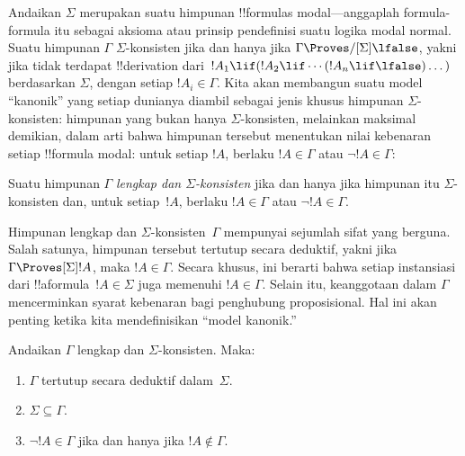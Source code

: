 \documentclass[../../../include/open-logic-section]{subfiles}
\begin{document}


Andaikan $\Sigma$ merupakan suatu himpunan !!{formula}s modal---anggaplah
formula-formula itu sebagai aksioma atau prinsip pendefinisi suatu logika
modal normal. Suatu himpunan $\Gamma$ $\Sigma$-konsisten jika dan hanya jika
$\Gamma \Proves/[\Sigma] \lfalse$, yakni jika tidak terdapat !!{derivation}
dari~$!A_1 \lif (!A_2 \lif \cdots (!A_n \lif \lfalse)\dots)$ berdasarkan
$\Sigma$, dengan setiap $!A_i \in \Gamma$. Kita akan membangun suatu model
``kanonik'' yang setiap dunianya diambil sebagai jenis khusus himpunan
$\Sigma$-konsisten: himpunan yang bukan hanya $\Sigma$-konsisten, melainkan
maksimal demikian, dalam arti bahwa himpunan tersebut menentukan nilai
kebenaran setiap !!{formula} modal: untuk setiap $!A$, berlaku $!A \in
\Gamma$ atau $\lnot !A \in \Gamma$:

\begin{defn}
  Suatu himpunan $\Gamma$ \emph{lengkap dan $\Sigma$-konsisten} jika dan
  hanya jika himpunan itu $\Sigma$-konsisten dan, untuk setiap~$!A$, berlaku
  $!A \in \Gamma$ atau $\lnot !A \in \Gamma$.
\end{defn}

Himpunan lengkap dan $\Sigma$-konsisten~$\Gamma$ mempunyai sejumlah sifat
yang berguna. Salah satunya, himpunan tersebut tertutup secara deduktif,
yakni jika $\Gamma \Proves[\Sigma] !A$, maka $!A \in \Gamma$. Secara khusus,
ini berarti bahwa setiap instansiasi dari !!a{formula}~$!A \in \Sigma$ juga
memenuhi $!A \in \Gamma$. Selain itu, keanggotaan dalam $\Gamma$
mencerminkan syarat kebenaran bagi penghubung proposisional. Hal ini akan
penting ketika kita mendefinisikan ``model kanonik.''

\begin{prop}
  Andaikan $\Gamma$ lengkap dan $\Sigma$-konsisten. Maka:
  \begin{enumerate}
  \item {}%
    $\Gamma$ tertutup secara deduktif dalam~$\Sigma$.
  \item {}%
    $\Sigma \subseteq \Gamma$.
  \item {}%
    $\lnot!A \in \Gamma$ jika dan hanya jika $!A \notin
    \Gamma$.
  \end{enumerate}
\end{prop}
\end{document}
